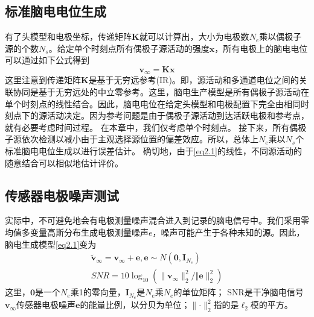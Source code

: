 \subsection{标准脑电电位生成}
有了头模型和电极坐标，传递矩阵$\mathbf{K}$就可以计算出，大小为电极数$N_e$乘以偶极子源的个数$N_s$。给定单个时刻点所有偶极子源活动的强度$\mathbf{x}$，所有电极上的脑电电位可以通过如下公式得到
\begin{equation}\label{eq2.1}
\mathbf{v}_{\infty}=\mathbf{Kx}
\end{equation}
这里注意到传递矩阵$\mathbf{K}$是基于无穷远参考(IR)。即，源活动和多通道电位之间的关联协同是基于无穷远处的中立零参考。这里，脑电生产模型是所有偶极子源活动在单个时刻点的线性结合。因此，脑电电位在给定头模型和电极配置下完全由相同时刻点下的源活动决定。因为参考问题是由于偶极子源活动到达活跃电极和参考点，就有必要考虑时间过程。 在本章中，我们仅考虑单个时刻点。 接下来，所有偶极子源依次检测以减小由于主观选择源位置的偏差效应。所以，总体上$N_e$乘以$N_s$个标准脑电电位生成以进行误差估计。 确切地，由于\eqref{eq2.1}的线性，不同源活动的随意结合可以相似地估计评价。
\subsection{传感器电极噪声测试}
实际中，不可避免地会有电极测量噪声混合进入到记录的脑电信号中。我们采用零均值多变量高斯分布生成电极测量噪声$e$，噪声可能产生于各种未知的源。因此，脑电生成模型\eqref{eq2.1}变为
\begin{equation}\label{eq2.2}
\begin{split}
\tilde{\mathbf{v}}_\infty=\mathbf{v}_{\infty}+\mathbf{e},\mathbf{e}\sim{N(\mathbf{0},\mathbf{I}_{N_e})}\\
SNR=10\log_{10}(\lVert{\mathbf{v}_\infty}\rVert_2^2/\Vert{\mathbf{e}}\rVert_2^2)
\end{split}
\end{equation}
这里，$\mathbf{0}$是一个$N_e$乘1的零向量，$\mathbf{I}_{N_e}$是$N_e$乘$N_e$的单位矩阵； SNR是干净脑电信号$\mathbf{v}_{\infty}$传感器电极噪声$\mathbf{e}$的能量比例，以分贝为单位；$\lVert{\cdot}\rVert_2^2$指的是$\ell_2$模的平方。
